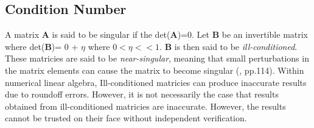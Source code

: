         \subsection{Condition Number}

                A matrix \textbf{A} is said to be singular if the det(\textbf{A})=0.
                Let \textbf{B} be an invertible matrix where det(\textbf{B})= 0 + $\eta$
                where $0<\eta<<1$. \textbf{B} is then said to be \textit{ill-conditioned}. These matricies
                are said to be \textit{near-singular}, meaning that small perturbations in the matrix elements can cause
                the matrix to become singular (\cite{item:19}, pp.114). Within numerical linear algebra, Ill-conditioned matricies
                can produce inaccurate results due to roundoff errors. However, it is not necessarily the case that
                results obtained from ill-conditioned matricies are inaccurate. However, the results cannot be trusted
                on their face without independent verification.\\

